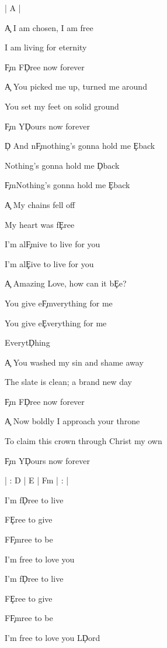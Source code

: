 \documentclass[9pt]{extarticle}
\begin{document}
\bsong

\bi
| A |
\ei

\bv
\c{A} I am chosen, I am free

I am living for eternity

\c{F\s m} F\c{D}ree now forever
\ev

\bv
\c{A} You picked me up, turned me around

You set my feet on solid ground

\c{F\s m} Y\c{D}ours now forever
\ev

\bp
\c{D} And n\c{F\s m}othing's gonna hold me \c{E}back

Nothing's gonna hold me \c{D}back

\c{F\s m}Nothing's gonna hold me \c{E}back
\ep

\bc
\c{A} My chains fell off

My heart was f\c{E}ree

I'm al\c{F\s m}ive to live for you

I'm al\c{E}ive to live for you



\c{A} Amazing Love, how can it b\c{E}e?

You give e\c{F\s m}verything for me

You give e\c{E}verything for me

Everyt\c{D}hing
\ec

\bv
\c{A} You washed my sin and shame away

The slate is clean; a brand new day

\c{F\s m} F\c{D}ree now forever
\ev

\bv
\c{A} Now boldly I approach your throne

To claim this crown through Christ my own

\c{F\s m} Y\c{D}ours now forever
\ev



\bin
| : D | E | F\s m | : |
\ein

\bb[2]
I'm f\c{D}ree to live

F\c{E}ree to give

F\c{F\s m}ree to be

I'm free to love you
\eb

\bb
I'm f\c{D}ree to live

F\c{E}ree to give

F\c{F\s m}ree to be

I'm free to love you L\c{D}ord
\eb


\esong
\end{document}
